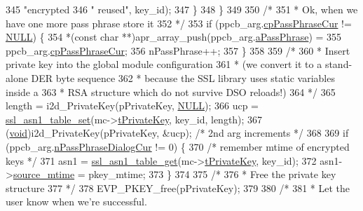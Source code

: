 \begin{DoxyCode}
{{{{{{{{{{345                          \textcolor{stringliteral}{"encrypted %
346                          \textcolor{stringliteral}{" reused"}, key\_id);
347         \}
348     \}
349 
350     \textcolor{comment}{/*}
351 \textcolor{comment}{     * Ok, when we have one more pass phrase store it}
352 \textcolor{comment}{     */}
353     \textcolor{keywordflow}{if} (ppcb\_arg.\hyperlink{structpphrase__cb__arg__t_af6aaf85042706fa2215ce1164a2aa7eb}{cpPassPhraseCur} != \hyperlink{pcre_8txt_ad7f989d16aa8ca809a36bc392c07fba1}{NULL}) \{
354         *(\textcolor{keyword}{const} \textcolor{keywordtype}{char} **)apr\_array\_push(ppcb\_arg.\hyperlink{structpphrase__cb__arg__t_ae08f1163b038c528152af8a490f09f27}{aPassPhrase}) =
355             ppcb\_arg.\hyperlink{structpphrase__cb__arg__t_af6aaf85042706fa2215ce1164a2aa7eb}{cpPassPhraseCur};
356         nPassPhrase++;
357     \}
358 
359     \textcolor{comment}{/*}
360 \textcolor{comment}{     * Insert private key into the global module configuration}
361 \textcolor{comment}{     * (we convert it to a stand-alone DER byte sequence}
362 \textcolor{comment}{     * because the SSL library uses static variables inside a}
363 \textcolor{comment}{     * RSA structure which do not survive DSO reloads!)}
364 \textcolor{comment}{     */}
365     length = i2d\_PrivateKey(pPrivateKey, \hyperlink{pcre_8txt_ad7f989d16aa8ca809a36bc392c07fba1}{NULL});
366     ucp = \hyperlink{group__MOD__SSL__PRIVATE_ga4504251e36120aa24b691d877268e323}{ssl\_asn1\_table\_set}(mc->\hyperlink{structSSLModConfigRec_a6a0d1bba0a5cc5a5a9efbf59387313eb}{tPrivateKey}, key\_id, length);
367     (\hyperlink{group__MOD__ISAPI_gacd6cdbf73df3d9eed42fa493d9b621a6}{void})i2d\_PrivateKey(pPrivateKey, &ucp); \textcolor{comment}{/* 2nd arg increments */}
368 
369     \textcolor{keywordflow}{if} (ppcb\_arg.\hyperlink{structpphrase__cb__arg__t_a451eb1ab16d0c471defcb513d5dc5bef}{nPassPhraseDialogCur} != 0) \{
370         \textcolor{comment}{/* remember mtime of encrypted keys */}
371         asn1 = \hyperlink{group__MOD__SSL__PRIVATE_ga51df44abeb791f6d84a4b2d0391b7ccb}{ssl\_asn1\_table\_get}(mc->\hyperlink{structSSLModConfigRec_a6a0d1bba0a5cc5a5a9efbf59387313eb}{tPrivateKey}, key\_id);
372         asn1->\hyperlink{structssl__asn1__t_aae73a4b4725a985d1cdc4dbb8da0a049}{source\_mtime} = pkey\_mtime;
373     \}
374 
375     \textcolor{comment}{/*}
376 \textcolor{comment}{     * Free the private key structure}
377 \textcolor{comment}{     */}
378     EVP\_PKEY\_free(pPrivateKey);
379 
380     \textcolor{comment}{/*}
381 \textcolor{comment}{     * Let the user know when we're successful.}
}}}}}}}}}}}
\end{DoxyCode}
